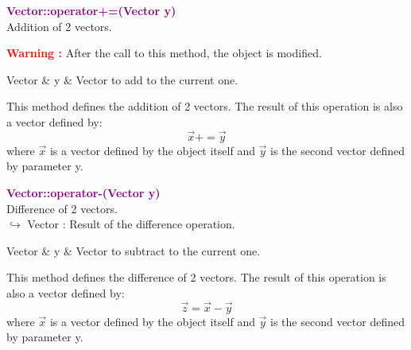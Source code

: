\textcolor{purple}{\textbf{Vector::operator+=(Vector y)}}\label{Vector::operator+=(Vector y)}\\
Addition of 2 vectors.

\hspace*{10mm}\textcolor{red}{\textbf{Warning :}} After the call to this method, the object is modified.

\begin{tcolorbox}[width=\textwidth,myArgs,tabularx={ll|R}]
Vector & y & Vector to add to the current one.
\end{tcolorbox}

This method defines the addition of 2 vectors.
The result of this operation is also a vector defined by:
\begin{equation*}
\overrightarrow{x}+=\overrightarrow{y}
\end{equation*}
where $\overrightarrow{x}$ is a vector defined by the object itself and $\overrightarrow{y}$ is the second vector defined by parameter y.

\textcolor{purple}{\textbf{Vector::operator-(Vector y)}}\label{Vector::operator-(Vector y)}\\
Difference of 2 vectors.\\ \hspace*{10mm}$\hookrightarrow$ Vector : Result of the difference operation.

\begin{tcolorbox}[width=\textwidth,myArgs,tabularx={ll|R}]
Vector & y & Vector to subtract to the current one.
\end{tcolorbox}

This method defines the difference of 2 vectors.
The result of this operation is also a vector defined by:
\begin{equation*}
\overrightarrow{z}=\overrightarrow{x}-\overrightarrow{y}
\end{equation*}
where $\overrightarrow{x}$ is a vector defined by the object itself and $\overrightarrow{y}$ is the second vector defined by parameter y.

